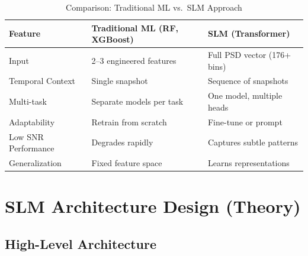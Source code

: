 \documentclass[12pt, a4paper]{article}
\begin{document}
\begin{table}[H]
\centering
\caption{Comparison: Traditional ML vs.\ SLM Approach}
\label{tab:comparison}
\begin{tabular}{@{}p{3.2cm}p{5cm}p{5.5cm}@{}}
\toprule
\textbf{Feature}       & \textbf{Traditional ML (RF, XGBoost)} & \textbf{SLM (Transformer)} \\
\midrule
Input                  & 2--3 engineered features        & Full PSD vector (176+ bins) \\
Temporal Context       & Single snapshot                 & Sequence of snapshots \\
Multi-task             & Separate models per task        & One model, multiple heads \\
Adaptability           & Retrain from scratch            & Fine-tune or prompt \\
Low SNR Performance    & Degrades rapidly                & Captures subtle patterns \\
Generalization         & Fixed feature space             & Learns representations \\
\bottomrule
\end{tabular}
\end{table}


\section{SLM Architecture Design (Theory)}

\subsection{High-Level Architecture}
\end{document}
